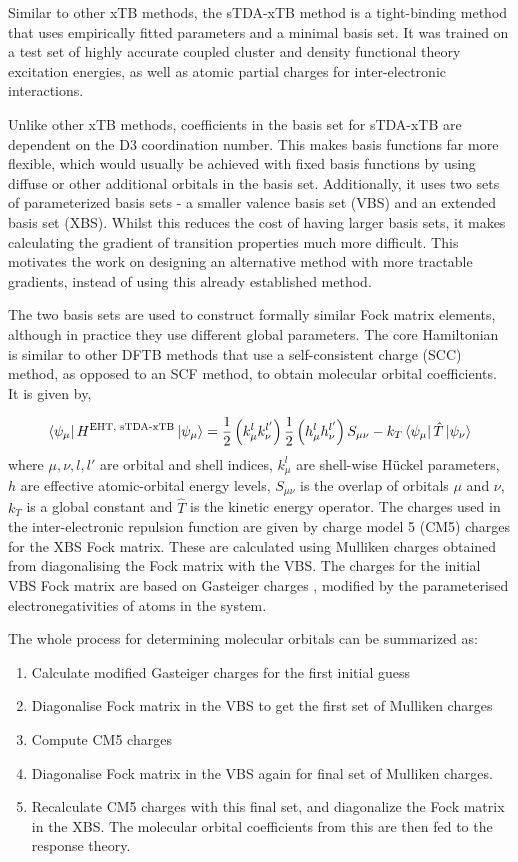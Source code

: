 Similar to other xTB methods, the sTDA-xTB method is a tight-binding method that
uses empirically fitted parameters and a minimal basis set. It was trained on a
test set of highly accurate coupled cluster and density functional theory
excitation energies, as well as atomic partial charges for inter-electronic interactions.

Unlike other xTB methods, coefficients in the basis set for sTDA-xTB are dependent on the D3
coordination number. This makes basis functions far more flexible, which would usually
be achieved with fixed basis functions by using diffuse or other additional orbitals in
the basis set. Additionally, it uses two sets of parameterized basis sets - a
smaller valence basis set (VBS) and an extended basis set (XBS). Whilst this reduces
the cost of having larger basis sets, it makes calculating the gradient of transition
properties much more difficult. This motivates the work on designing an alternative
method with more tractable gradients, instead of using this already established method.

The two basis sets are used to construct formally similar Fock matrix elements,
although in practice they use different global parameters. The core Hamiltonian
is similar to other DFTB methods that use a self-consistent charge (SCC) method, as
opposed to an SCF method, to obtain molecular orbital coefficients. It is given by,

\begin{equation}
\bra{\psi_\mu} H^{\text{EHT, sTDA-xTB}} \ket{\psi_\mu}= \frac{1}{2} \left(k^l_\mu k^{l'}_\nu\right) \frac{1}{2} \left(h^l_\mu h^{l'}_\nu\right) S_{\mu\nu} - k_T \bra{\psi_\mu}\hat{T}\ket{\psi_\nu}
\end{equation}
%
where $\mu,\nu,l,l'$ are orbital and shell indices, $k^l_\mu$ are shell-wise 
H{\"u}ckel parameters, $h$ are effective atomic-orbital energy levels, $S_{\mu\nu}$
is the overlap of orbitals $\mu$ and $\nu$, $k_T$ is a global constant and $\hat{T}$
is the kinetic energy operator. The charges used in the inter-electronic repulsion 
function are given by charge model 5 (CM5) \cite{Marenich2012} charges for the XBS
Fock matrix. These are calculated using Mulliken charges obtained from diagonalising
the Fock matrix with the VBS. The charges for the initial VBS Fock matrix are based
on Gasteiger charges \cite{Gasteiger1978}, modified by the parameterised
electronegativities of atoms in the system.

The whole process for determining molecular orbitals can be summarized as:
\begin{enumerate}
	\item Calculate modified Gasteiger charges for the first initial guess
	\item Diagonalise Fock matrix in the VBS to get the first set of Mulliken charges
	\item Compute CM5 charges
	\item Diagonalise Fock matrix in the VBS again for final set of Mulliken charges.
	\item Recalculate CM5 charges with this final set, and diagonalize the Fock matrix in the XBS. The molecular orbital coefficients from this are then fed to the response theory.
\end{enumerate}

